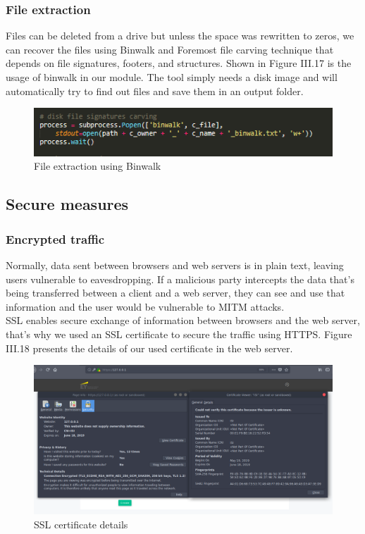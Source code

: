 \subsubsection*{File extraction}
Files can be deleted from a drive but unless the space was rewritten to zeros, we can recover the files using Binwalk and Foremost file carving technique that depends on file signatures, footers, and structures. Shown in Figure III.17 is the usage of binwalk in our module. The tool simply needs a disk image and will automatically try to find out files and save them in an output folder.
\begin{figure}[H]
\centering
\includegraphics[width=0.8\columnwidth]{Figures/disk.png}
\caption{File extraction using Binwalk}
\end{figure}

\subsection{Secure measures}
\subsubsection{Encrypted traffic}
Normally, data sent between browsers and web servers is in plain text, leaving users vulnerable to eavesdropping. If a malicious party intercepts the data that's being transferred between a client and a web server, they can see and use that information and the user would be vulnerable to MITM attacks.\\
SSL enables secure exchange of information between browsers and the web server, that's why we used an SSL certificate to secure the traffic using HTTPS. Figure III.18 presents the details of our used certificate in the web server.
\begin{figure}[H]
\centering
\includegraphics[width=0.8\columnwidth]{Figures/ssl.png}
\caption{SSL certificate details}
\end{figure}
